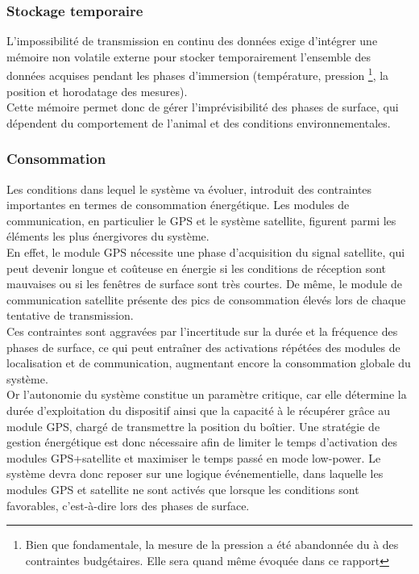 \documentclass[12pt]{article}
\begin{document}
\subsubsection{Stockage temporaire}
L'impossibilité de transmission en continu des données exige d'intégrer une mémoire non volatile externe pour stocker temporairement l'ensemble des données acquises pendant les phases d'immersion (température, pression \footnote{Bien que fondamentale, la mesure de la pression a été abandonnée du à des contraintes budgétaires. Elle sera quand même évoquée dans ce rapport}, la position et horodatage des mesures). \\
Cette mémoire permet donc de gérer l’imprévisibilité des phases de surface, qui dépendent du comportement de l’animal et des conditions environnementales.

\subsubsection{Consommation}
Les conditions dans lequel le système va évoluer, introduit des contraintes importantes en termes de consommation énergétique. Les modules de communication, en particulier le GPS et le système satellite, figurent parmi les éléments les plus énergivores du système. \\
En effet, le module GPS nécessite une phase d’acquisition du signal satellite, qui peut devenir longue et coûteuse en énergie si les conditions de réception sont mauvaises ou si les fenêtres de surface sont très courtes. De même, le module de communication satellite présente des pics de consommation élevés lors de chaque tentative de transmission. \\
Ces contraintes sont aggravées par l’incertitude sur la durée et la fréquence des phases de surface, ce qui peut entraîner des activations répétées des modules de localisation et de communication, augmentant encore la consommation globale du système. \\

Or l’autonomie du système constitue un paramètre critique, car elle détermine la durée d’exploitation du dispositif ainsi que la capacité à le récupérer grâce au module GPS, chargé de transmettre la position du boîtier. Une stratégie de gestion énergétique est donc nécessaire afin de limiter le temps d'activation des modules GPS+satellite et maximiser le temps passé en mode low-power. Le système devra donc reposer sur une logique événementielle, dans laquelle les modules GPS et satellite ne sont activés que lorsque les conditions sont favorables, c’est-à-dire lors des phases de surface.
\end{document}
